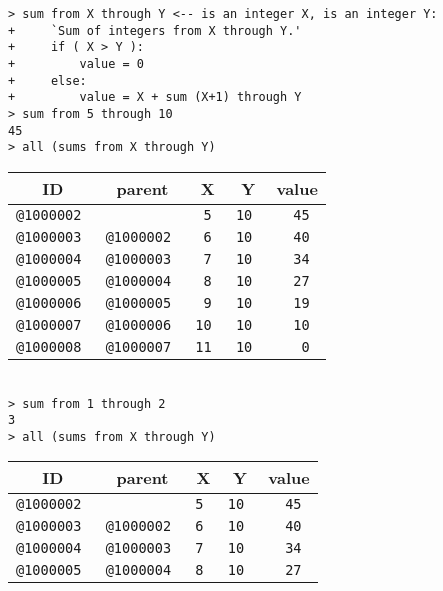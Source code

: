 \documentclass[12pt]{article}
\newenvironment{indpar}[1][0.3in]%
	{\begin{list}{}%
		     {\setlength{\itemsep}{0in}%
		      \setlength{\topsep}{0in}%
		      \setlength{\parsep}{1ex}%
		      \setlength{\labelwidth}{#1}%
		      \setlength{\leftmargin}{#1}%
		      \addtolength{\leftmargin}{\labelsep}}%
	 \item}%
	{\end{list}}
\begin{document}
\begin{indpar}
\verb|> sum from X through Y <-- is an integer X, is an integer Y:| \\
\verb|+     `Sum of integers from X through Y.'| \\
\verb|+     if ( X > Y ):| \\
\verb|+         value = 0| \\
\verb|+     else:| \\
\verb|+         value = X + sum (X+1) through Y| \\
\verb|> sum from 5 through 10| \\
\verb|45| \\
\verb|> all (sums from X through Y)| \\
\begin{tabular}{|r|r|r|r|r|}
\hline
\multicolumn{1}{|c}{\bf ID} &
\multicolumn{1}{|c}{\bf parent} &
\multicolumn{1}{|c}{\bf X} &
\multicolumn{1}{|c}{\bf Y} &
\multicolumn{1}{|c|}{\bf value} \\
\hline
\tt @1000002 &       		& \tt 5	& \tt	10	& \tt 45 \\
\tt @1000003 & \tt @1000002	& \tt 6	& \tt	10	& \tt 40 \\
\tt @1000004 & \tt @1000003	& \tt 7	& \tt	10	& \tt 34 \\
\tt @1000005 & \tt @1000004	& \tt 8	& \tt	10	& \tt 27 \\
\tt @1000006 & \tt @1000005	& \tt 9	& \tt	10	& \tt 19 \\
\tt @1000007 & \tt @1000006	& \tt 10	& \tt	10	& \tt 10 \\
\tt @1000008 & \tt @1000007	& \tt 11	& \tt	10	& \tt 0 \\
\hline
\end{tabular} \\[0.5ex]
\verb|> sum from 1 through 2| \\
\verb|3| \\
\verb|> all (sums from X through Y)| \\
\begin{tabular}{|r|r|r|r|r|}
\hline
\multicolumn{1}{|c}{\bf ID} &
\multicolumn{1}{|c}{\bf parent} &
\multicolumn{1}{|c}{\bf X} &
\multicolumn{1}{|c}{\bf Y} &
\multicolumn{1}{|c|}{\bf value} \\
\hline
\tt @1000002 &       		& \tt 5		& \tt	10	& \tt 45 \\
\tt @1000003 & \tt @1000002	& \tt 6		& \tt	10	& \tt 40 \\
\tt @1000004 & \tt @1000003	& \tt 7		& \tt	10	& \tt 34 \\
\tt @1000005 & \tt @1000004	& \tt 8		& \tt	10	& \tt 27 \\

\end{tabular}
\end{indpar}
\end{document}
